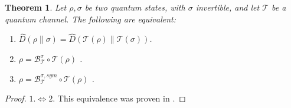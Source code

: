 \documentclass[11pt]{article}
\theoremstyle{newdefinition}
\theoremstyle{newplain}
\newtheorem{theorem}[definition]{Theorem}
\theoremstyle{myplain}
\DeclareMathOperator{\1}{\mathds{1}}
\newcommand{\PCR}[1]{{\color{blue}#1}}
\begin{document}
{\begin{theorem}\label{thm:equivalence_recovery_conditions}
    Let $\rho, \sigma$ be two quantum states, with $\sigma$ invertible, and let $\mathcal{T}$ be a quantum channel. The following are equivalent:
    \begin{enumerate}
        \item $\widehat{D}(\rho \| \sigma) = \widehat{D}(\mathcal{T}(\rho) \| \mathcal{T}(\sigma) ) $.
        \item $\rho=\mathcal{B}^\sigma_{\mathcal{T}} \circ \mathcal{T} (\rho)$ .
        \item $\rho =\mathcal{B}^{\sigma,sym}_{\mathcal{T}} \circ \mathcal{T} (\rho)$ .
    \end{enumerate}
\end{theorem}

\begin{proof}
    \underline{$1. \Leftrightarrow 2. $} This equivalence was proven in \cite{BluhmCapel-BSentropy-2019}.


\end{proof}}
\end{document}
